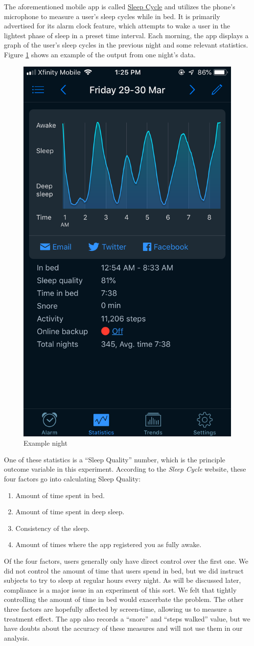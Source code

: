 \documentclass[12pt,]{article}
\providecommand{\tightlist}{%
  \setlength{\itemsep}{0pt}\setlength{\parskip}{0pt}}
\begin{document}
The aforementioned mobile app is called \href{www.sleepcycle.com}{Sleep
Cycle} and utilizes the phone's microphone to measure a user's sleep
cycles while in bed. It is primarily advertised for its alarm clock
feature, which attempts to wake a user in the lightest phase of sleep in
a preset time interval. Each morning, the app displays a graph of the
user's sleep cycles in the previous night and some relevant statistics.
Figure \ref{fig:example_night} shows an example of the output from one
night's data.

\begin{figure}[H]

{\centering \includegraphics[width=0.25\linewidth]{img/example_night} 

}

\caption{Example night}\label{fig:example_night}
\end{figure}

One of these statistics is a ``Sleep Quality'' number, which is the
principle outcome variable in this experiment. According to the
\emph{Sleep Cycle} website, these four factors go into calculating Sleep
Quality:

\begin{enumerate}
\def\labelenumi{\arabic{enumi}.}
\tightlist
\item
  Amount of time spent in bed.
\item
  Amount of time spent in deep sleep.
\item
  Consistency of the sleep.
\item
  Amount of times where the app registered you as fully awake.
\end{enumerate}

Of the four factors, users generally only have direct control over the
first one. We did not control the amount of time that users spend in
bed, but we did instruct subjects to try to sleep at regular hours every
night. As will be discussed later, compliance is a major issue in an
experiment of this sort. We felt that tightly controlling the amount of
time in bed would exacerbate the problem. The other three factors are
hopefully affected by screen-time, allowing us to measure a treatment
effect. The app also records a ``snore'' and ``steps walked'' value, but
we have doubts about the accuracy of these measures and will not use
them in our analysis.
\end{document}
